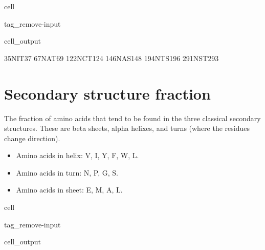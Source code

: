 \documentclass[letterpaper,10pt,english]{jupyterBook}
\begin{document}
\begin{sphinxuseclass}{cell}
\begin{sphinxuseclass}{tag_remove-input}\begin{sphinxVerbatimOutput}

\begin{sphinxuseclass}{cell_output}
\begin{sphinxVerbatim}[commandchars=\\\{\}]
35\PYGZhy{}NIT\PYGZhy{}37
67\PYGZhy{}NAT\PYGZhy{}69
122\PYGZhy{}NCT\PYGZhy{}124
146\PYGZhy{}NAS\PYGZhy{}148
194\PYGZhy{}NTS\PYGZhy{}196
291\PYGZhy{}NST\PYGZhy{}293
\end{sphinxVerbatim}

\end{sphinxuseclass}\end{sphinxVerbatimOutput}

\end{sphinxuseclass}
\end{sphinxuseclass}

\section{Secondary structure fraction}
\label{\detokenize{ipynb/chapter1:secondary-structure-fraction}}
\sphinxAtStartPar
The fraction of amino acids that tend to be found in the three classical secondary structures. These are beta sheets, alpha helixes, and turns (where the residues change direction).
\begin{itemize}
\item {} 
\sphinxAtStartPar
Amino acids in helix: V, I, Y, F, W, L.

\item {} 
\sphinxAtStartPar
Amino acids in turn: N, P, G, S.

\item {} 
\sphinxAtStartPar
Amino acids in sheet: E, M, A, L.

\end{itemize}

\begin{sphinxuseclass}{cell}
\begin{sphinxuseclass}{tag_remove-input}\begin{sphinxVerbatimOutput}

\begin{sphinxuseclass}{cell_output}
\noindent{}

\end{sphinxuseclass}\end{sphinxVerbatimOutput}

\end{sphinxuseclass}
\end{sphinxuseclass}
\end{document}

